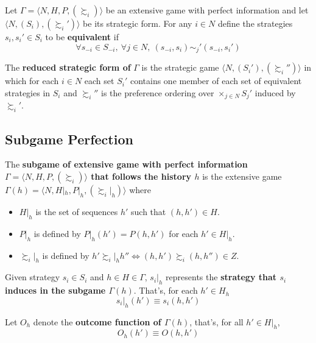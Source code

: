 \documentclass[11pt]{article}
\begin{document}
			\begin{definition}[95.1.1]
				Let $\Gamma = \langle N, H, P, (\succsim_i) \rangle$ be an extensive game with perfect information and let $\langle N, (S_i), (\succsim_i') \rangle$ be its strategic form. For any $i \in N$ define the strategies $s_i, s_i' \in S_i$ to be \textbf{equivalent} if 
				\[
					\forall s_{-i} \in S_{-i},\ \forall j \in N,\ (s_{-i}, s_i) \sim_j' (s_{-i}, s_i')
				\]
			\end{definition}
			
			\begin{definition}[95.1.2]
				The \textbf{reduced strategic form of} $\Gamma$ is the strategic game $\langle N, (S_i'), (\succsim_i'') \rangle$ in which for each $i \in N$ each set $S_i'$ contains one member of each set of equivalent strategies in $S_i$ and $\succsim_{i}''$ is the preference ordering over $\times_{j \in N} S_j'$ induced by $\succsim_i'$.
			\end{definition}
		\subsection{Subgame Perfection}
			\begin{definition}[97.1]
				The \textbf{subgame of extensive game with perfect information $\Gamma = \langle N, H, P, (\succsim_i) \rangle$ that follows the history $h$} is the extensive  game $\Gamma(h) = \langle N, H|_h, P|_h, (\succsim_i|_h) \rangle$ where
				\begin{itemize}
					\item $H|_h$ is the set of sequences $h'$ such that $(h, h') \in H$.
					\item $P|_h$ is defined by $P|_h(h') = P(h, h')$ for each $h' \in H|_h$.
					\item $\succsim_i|_h$ is defined by $h' \succsim_i|_h h'' \iff (h, h') \succsim_i (h, h'') \in Z$.
				\end{itemize}
			\end{definition}
			
			\begin{notation}[pg.97]
				Given strategy $s_i \in S_i$ and $h \in H \in \Gamma$, $s_i|_h$ represents the \textbf{strategy that $s_i$ induces in the subgame $\Gamma(h)$}. That's, for each $h' \in H_h$
				\[
					s_i|_h (h') \equiv s_i(h, h')
				\]
			\end{notation}
			
			\begin{notation}
				Let $O_h$ denote the \textbf{outcome function of $\Gamma(h)$}, that's, for all $h' \in H|_h$,
				\[
					O_h(h') \equiv O(h, h')
				\]
			\end{notation}
			
\end{document}

